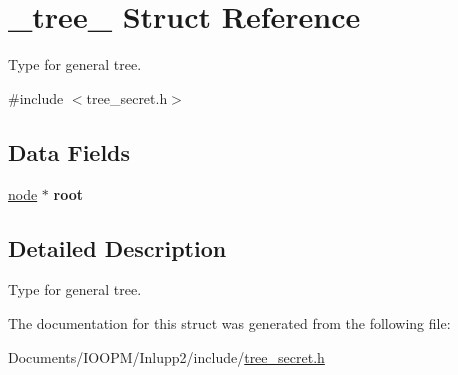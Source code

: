 \hypertarget{struct__tree__}{}\section{\+\_\+tree\+\_\+ Struct Reference}
\label{struct__tree__}


Type for general tree.  




{\ttfamily \#include $<$tree\+\_\+secret.\+h$>$}

\subsection*{Data Fields}
\begin{DoxyCompactItemize}
\item 
\hypertarget{struct__tree___aa570215f2f913275d6ff0d586e436d21}{}\hyperlink{struct__node__}{node} $\ast$ {\bfseries root}\label{struct__tree___aa570215f2f913275d6ff0d586e436d21}

\end{DoxyCompactItemize}


\subsection{Detailed Description}
Type for general tree. 

The documentation for this struct was generated from the following file\+:\begin{DoxyCompactItemize}
\item 
Documents/\+I\+O\+O\+P\+M/\+Inlupp2/include/\hyperlink{tree__secret_8h}{tree\+\_\+secret.\+h}\end{DoxyCompactItemize}
